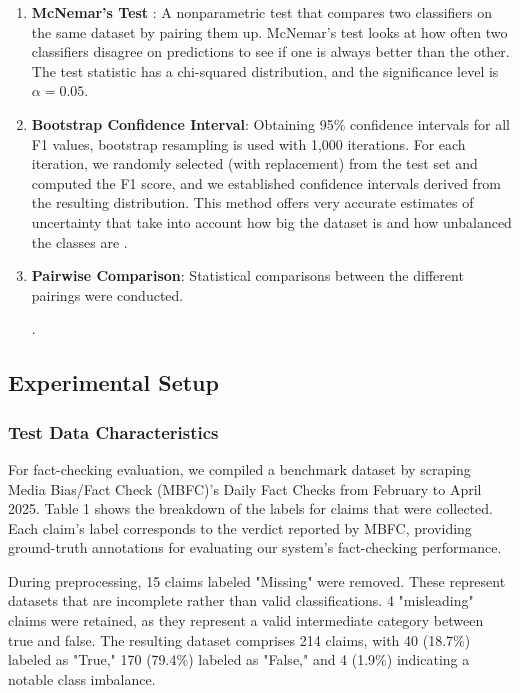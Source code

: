 \documentclass[11pt]{article}
\begin{document}
\begin{enumerate}

    \item \textbf{McNemar's Test} \cite{r35}: A nonparametric test that compares two classifiers on the same dataset by pairing them up. McNemar's test looks at how often two classifiers disagree on predictions to see if one is always better than the other. The test statistic has a chi-squared distribution, and the significance level is $\alpha=0.05$.

    \item \textbf{Bootstrap Confidence Interval}: Obtaining 95\% confidence intervals for all F1 values, bootstrap resampling is used  with 1,000 iterations. For each iteration, we randomly selected (with replacement) from the test set and computed the F1 score, and we established confidence intervals derived from the resulting distribution. This method offers very accurate estimates of uncertainty that take into account how big the dataset is and how unbalanced the classes are
.

    \item \textbf{Pairwise Comparison}: Statistical comparisons between the different pairings were conducted.

.

    
\end{enumerate}


\subsection{Experimental Setup}
\subsubsection{Test Data Characteristics}
For fact-checking evaluation, we compiled a benchmark dataset by scraping Media Bias/Fact Check (MBFC)’s Daily Fact Checks from February to April 2025. Table 1 shows the breakdown of the labels for claims that were collected. Each claim’s label corresponds to the verdict reported by MBFC, providing ground-truth annotations for evaluating our system’s fact-checking performance. 

During preprocessing, 15 claims labeled "Missing" were removed. These represent datasets that are incomplete rather than valid classifications. 4 "misleading" claims were retained, as they represent a valid intermediate category between true and false. The resulting dataset comprises 214 claims, with 40 (18.7\%) labeled as "True," 170 (79.4\%) labeled as "False,"  and  4 (1.9\%) indicating a notable class imbalance. 
\end{document}
